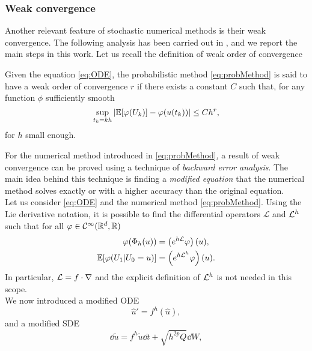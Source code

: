 \subsubsection{Weak convergence}

Another relevant feature of stochastic numerical methods is their weak convergence. The following analysis has been carried out in \cite{CGS16}, and we report the main steps in this work. Let us recall the definition of weak order of convergence
\begin{definition} Given the equation \eqref{eq:ODE}, the probabilistic method \eqref{eq:probMethod} is said to have a weak order of convergence $r$ if there exists a constant $C$ such that, for any function $\phi$ sufficiently smooth
	\begin{equation}
	\sup_{t_k = kh} \abs{\mathbb{E}[\varphi(U_k)] - \varphi(u(t_k))} \leq Ch^r,
	\end{equation}
for $h$ small enough.
\end{definition}
\noindent For the numerical method introduced in \eqref{eq:probMethod}, a result of weak convergence can be proved using a technique of \textit{backward error analysis}. The main idea behind this technique is finding a \textit{modified equation} that the numerical method solves exactly or with a higher accuracy than the original equation. \\
Let us consider \eqref{eq:ODE} and the numerical method \eqref{eq:probMethod}. Using the Lie derivative notation, it is possible to find the differential operators $\mathcal{L}$ and $\mathcal{L}^h$ such that for all $\varphi \in \mathcal{C}^\infty(\mathbb{R}^d, \mathbb{R})$ 
\begin{equation}\label{LieNotation}
\begin{aligned}
	\varphi(\Phi_h(u)) &= \left(e^{h\mathcal{L}} \varphi\right)(u), \\
	\mathbb{E}[\varphi(U_1 | U_0 = u)] &= \left(e^{h\mathcal{L}^h}\varphi\right)(u).
\end{aligned}
\end{equation}
In particular, $\mathcal{L} = f \cdot \nabla$ and the explicit definition of $\mathcal{L}^h$ is not needed in this scope. \\
We now introduced a modified ODE
\begin{equation}\label{modifiedODE}
	\hat u' = f^h(\hat u), 
\end{equation}
and a modified SDE
\begin{equation}\label{modifiedSDE}
	\dd{\tilde u} = f^h{\tilde u}\dd{t} + \sqrt{h^{2p} Q} \dd{W},
\end{equation}

